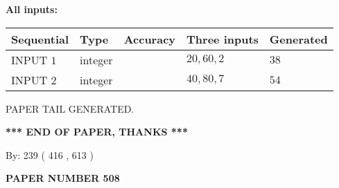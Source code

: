 \documentclass[12pt]{article}
\begin{document}
   
   
   
\noindent{}
   
   
   
   
\noindent\vspace{0.1in}\hspace{-0.08in} {\textbf{\Large{All inputs: }}}
   
   
  
  
\noindent\begin{tabular}{|l|l|l|l|l|}
\hline
 Sequential & Type & Accuracy & Three inputs & Generated \\ 
\hline
 
 
  INPUT $  1 $ & integer &  & $
 20
 , 
 60
 , 
 2
 $ & $ 38 $ 
 \\  \hline  
 
 
  INPUT $  2 $ & integer &  & $
 40
 , 
 80
 , 
 7
 $ & $ 54 $ 
 \\  \hline  
 \end{tabular}
   
   
   
   
   
   
 \vspace{0.2in}
 
   
   
\vspace{2.0in} PAPER TAIL GENERATED.
   
   
   
   
\vspace{1.0in} 
{\textbf{\large{ *** END OF PAPER, THANKS *** }}} 
   
   
\hspace{1.0in} By: 
 239 ( 416 ,  613 )
   
   
   
   
\newpage 
\setcounter{page}{ 
   508001 } 
   
   
   
   
 {\textbf{ \Large{ PAPER NUMBER  508  }}}
   
   
\vspace{0.2in}
   
   
   
   
   
   
   
   
 \vspace{0.2in}
 
 
 
\end{document}
